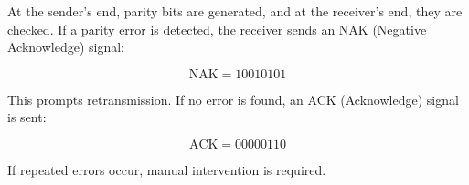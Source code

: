 \documentclass[a4paper,12pt]{article}
\begin{document}
At the sender's end, parity bits are generated, and at the receiver's end, they are checked. If a parity error is detected, the receiver sends an NAK (Negative Acknowledge) signal:

\[
\text{NAK} = 10010101
\]

This prompts retransmission. If no error is found, an ACK (Acknowledge) signal is sent:

\[
\text{ACK} = 00000110
\]

If repeated errors occur, manual intervention is required.
\end{document}
